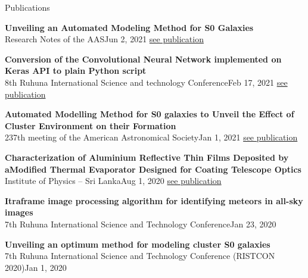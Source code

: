 \documentclass[
	11pt, %
]{./../assets/resume} %
\begin{document}



\begin{rSection}{Publications}

	\textbf{Unveiling an Automated Modeling Method for S0 Galaxies} \\
	{Research Notes of the AAS}{Jun 2, 2021}
	\href{https://iopscience.iop.org/article/10.3847/2515-5172/ac0dc0}{see publication}

	\textbf{Conversion of the Convolutional Neural Network implemented on Keras API to plain Python script} \\
	{8th Ruhuna International Science and technology Conference}{Feb 17, 2021}
	\href{https://www.researchgate.net/publication/360994589_Conversion_of_the_Convolutional_Neural_Network_implemented_on_Keras_API_to_plain_Python_script}{see publication}

	\textbf{Automated Modelling Method for S0 galaxies to Unveil the Effect of Cluster Environment on their Formation} \\
	{237th meeting of the American Astronomical Society}{Jan 1, 2021}
	\href{https://www.researchgate.net/publication/348993949_Automated_Modelling_Method_for_S0_galaxies_to_Unveil_the_Effect_of_Cluster_Environment_on_their_Formation}{see publication}
	
	\textbf{Characterization of Aluminium Reflective Thin Films Deposited by aModified Thermal Evaporator Designed for Coating Telescope Optics} \\
	{Institute of Physics – Sri Lanka}{Aug 1, 2020}
	\href{https://www.researchgate.net/publication/344312143_Characterization_of_Aluminium_Reflective_Thin_Films_Deposited_by_a_Modified_Thermal_Evaporator_Designed_for_Coating_Telescope_Optics}{see publication}

	\textbf{Itraframe image processing algorithm for identifying meteors in all-sky images} \\
	{7th Ruhuna International Science and Technology Conference}{Jan 23, 2020}

	\textbf{Unveiling an optimum method for modeling cluster S0 galaxies} \\
	{7th Ruhuna International Science and Technology Conference (RISTCON 2020)}{Jan 1, 2020}


\end{rSection}
\end{document}
